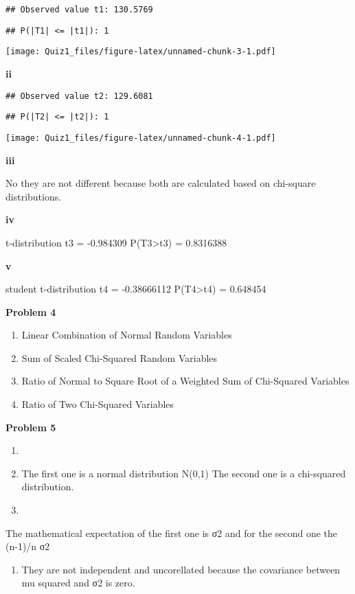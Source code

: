 \documentclass[
]{article}
\providecommand{\tightlist}{%
  \setlength{\itemsep}{0pt}\setlength{\parskip}{0pt}}
\begin{document}
\begin{verbatim}
## Observed value t1: 130.5769
\end{verbatim}

\begin{verbatim}
## P(|T1| <= |t1|): 1
\end{verbatim}

\texttt{[image: Quiz1\_files/figure-latex/unnamed-chunk-3-1.pdf]}

\textbf{ii}

\begin{verbatim}
## Observed value t2: 129.6081
\end{verbatim}

\begin{verbatim}
## P(|T2| <= |t2|): 1
\end{verbatim}

\texttt{[image: Quiz1\_files/figure-latex/unnamed-chunk-4-1.pdf]}

\textbf{iii}

No they are not different because both are calculated based on
chi-square distributions.

\textbf{iv}

t-distribution t3 = -0.984309 P(T3\textgreater t3) = 0.8316388

\textbf{v}

student t-distribution t4 = -0.38666112 P(T4\textgreater t4) = 0.648454

\textbf{Problem 4}

\begin{enumerate}
\def\labelenumi{\roman{enumi})}
\tightlist
\item
  Linear Combination of Normal Random Variables
\item
  Sum of Scaled Chi-Squared Random Variables
\item
  Ratio of Normal to Square Root of a Weighted Sum of Chi-Squared
  Variables
\item
  Ratio of Two Chi-Squared Variables
\end{enumerate}

\textbf{Problem 5}

\begin{enumerate}
\def\labelenumi{\roman{enumi})}
\item
\item
  The first one is a normal distribution N(0,1) The second one is a
  chi-squared distribution.
\item
\end{enumerate}

The mathematical expectation of the first one is σ2 and for the second
one the (n-1)/n σ2

\begin{enumerate}
\def\labelenumi{\roman{enumi})}
\setcounter{enumi}{2}
\tightlist
\item
  They are not independent and uncorellated because the covariance
  between mu squared and σ2 is zero.
\end{enumerate}
\end{document}
